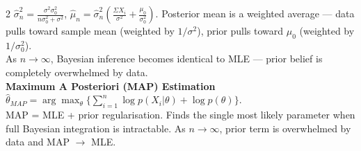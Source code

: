 \documentclass[10pt]{article}
\begin{document}
\begin{multicols*}{2}
$\hat{\sigma}^2_n = \frac{\sigma^2\sigma_0^2}{n\sigma_0^2 + \sigma^2}$, $\hat{\mu}_n = \hat{\sigma}^2_n(\frac{\Sigma X_i}{\sigma^2} + \frac{\mu_0}{\sigma_0^2})$. Posterior mean is a weighted average — data pulls toward sample mean (weighted by $1/\sigma^2$), prior pulls toward $\mu_0$ (weighted by $1/\sigma_0^2$).\\
As $n \to\infty$, Bayesian inference becomes identical to MLE — prior belief is completely overwhelmed by data.\\
\textbf{Maximum A Posteriori (MAP) Estimation} $\hat{\theta}_{MAP} = \arg \max_\theta \{ \sum_{i=1}^n \log p(X_i|\theta) + \log p(\theta) \}$.\\
MAP = MLE + prior regularisation. Finds the single most likely parameter when full Bayesian integration is intractable. As $n \to \infty$, prior term is overwhelmed by data and MAP $\to$ MLE.

\columnbreak

\end{multicols*}
\end{document}
